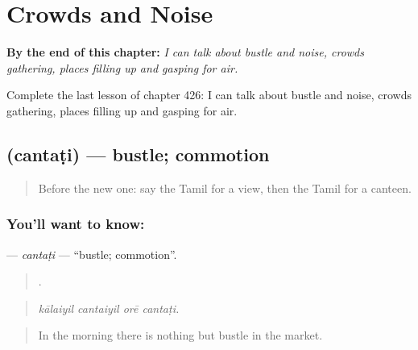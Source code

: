 
\chapter{Crowds and Noise}
\label{ch:ta-crowds-and-noise}

\begin{chapteropening}
\textbf{By the end of this chapter:} \emph{I can talk about bustle and noise, crowds gathering, places filling up and gasping for air.}

Complete the last lesson of chapter 426: I can talk about bustle and noise, crowds gathering, places filling up and gasping for air.
\end{chapteropening}

\section[\texorpdfstring{\ta{சந்தடி} (cantaṭi)}{சந்தடி (cantaṭi)}]{ (cantaṭi) — bustle; commotion}

\label{lesson:TA-C426-cantati}



\begin{quote}
Before the new one: say the Tamil for a view, then the Tamil for a canteen.
\end{quote}

\subsection*{You'll want to know: }
\textbf{} — \emph{cantaṭi} — \textquotedblleft{}bustle; commotion\textquotedblright{}.

\begin{quote}
   .
\end{quote}

\begin{quote}
\emph{kālaiyil cantaiyil orē cantaṭi.}
\end{quote}

\begin{quote}
In the morning there is nothing but bustle in the market.
\end{quote}

